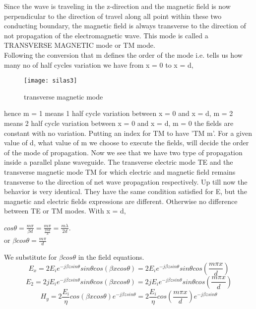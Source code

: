 Since the wave is traveling in the z-direction and the magnetic field is now perpendicular to the direction of travel along all point within these two conducting boundary, the magnetic field is always transverse to the direction of not propagation of the electromagnetic wave. This mode is called a TRANSVERSE MAGNETIC mode or TM mode.\\ 
Following the conversion that m defines the order of the mode i.e. tells us how many no of half cycles variation we have from x = 0 to x = d,\\
\begin{figure}[h]
	\centering
	\texttt{[image: silas3]}
	\caption{transverse magnetic mode}
\end{figure}
 hence m = 1 means 1 half cycle variation between x = 0 and x = d, m = 2 means 2 half cycle variation between x = 0 and x = d, m = 0 the fields are constant with no variation. Putting an index for TM to have 'TM m'. For a given value of d, what value of m we choose to execute the fields, will decide the order of the mode of propagation. Now we see that we have two type of propagation inside a parallel plane waveguide. The transverse electric mode TE and the transverse magnetic mode TM for which electric and magnetic field remains transverse to the direction of net wave propagation respectively. Up till now the behavior is very identical. They have the same condition satisfied for E, but the magnetic and electric fields expressions are different. Otherwise no difference between TE or TM modes.
With x = d,
\begin{center}
$cos\theta = \frac{m \pi}{\beta d} =\frac{m \pi}{\frac{2\pi d}{\lambda}} = \frac{m\lambda}{2d}$.\\
or $\beta cos\theta = \frac{m \pi}{d}$
\end{center} 
We substitute for $\beta cos\theta$ in the field equations.\\
\begin{dmath}
E_{x} = 2 E_{i} e^{-j\beta zsin\theta} sin\theta cos(\beta xcos\theta) = 2 E_{i} e^{-j\beta zsin\theta} sin\theta cos(\frac{m\pi x}{d})
\end{dmath}
\begin{dmath}
E_{2} = 2 jE_{i} e^{-j\beta zsin\theta} sin\theta cos(\beta xcos\theta) = 2 jE_{i} e^{-j\beta zsin\theta} sin\theta cos(\frac{m\pi x}{d})
\end{dmath}
\begin{dmath}
H_{y} = 2 \frac{E_{i}}{\eta} cos(\beta xcos\theta) e^{-j\beta zsin\theta} =2 \frac{E_{i}}{\eta} cos(\frac{m\pi x}{d}) e^{-j\beta zsin\theta} 
\end{dmath}
